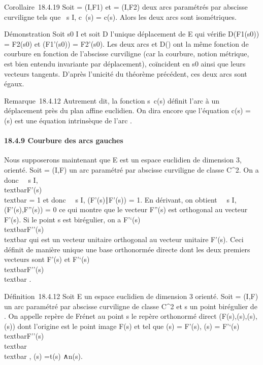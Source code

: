 Corollaire~18.4.19 Soit  = (I,F1) et 
= (I,F2) deux arcs paramétrés par abscisse curviligne tels que
\forall~s \in I, c~(s) =
c(s). Alors les deux arcs sont isométriques.

Démonstration Soit s0 \in I et soit D l'unique déplacement de E
qui vérifie D(F1(s0)) = F2(s0)
et \overrightarrowD(F1'(s0)) =
F2'(s0). Les deux arcs  et
D() ont la même fonction de courbure en fonction de
l'abscisse curviligne (car la courbure, notion métrique, est bien
entendu invariante par déplacement), coïncident en s0 ainsi
que leurs vecteurs tangents. D'après l'unicité du théorème précédent,
ces deux arcs sont égaux.

Remarque~18.4.12 Autrement dit, la fonction
s\mapsto~c\Gamma(s) définit l'arc \Gamma à un
déplacement près du plan affine euclidien. On dira encore que l'équation
c\Gamma(s) = \gamma(s) est une équation intrinsèque de l'arc \Gamma.

\paragraph{18.4.9 Courbure des arcs gauches}

Nous supposerons maintenant que E est un espace euclidien de dimension
3, orienté. Soit \Gamma = (I,F) un arc paramétré par abscisse curviligne de
classe C^2. On a donc \forall~~s \in I,
\\textbar{}F'(s)\\textbar{} = 1 et donc
\forall~~s \in I,
(F'(s)∣F'(s)) = 1. En dérivant, on obtient
\forall~~s \in I,(F'(s),F''(s)) = 0 ce qui montre que le
vecteur F''(s) est orthogonal au vecteur F'(s). Si le point s est
birégulier, on a  F'`(s) \over
\\textbar{}F''(s)\\textbar{} qui est un
vecteur unitaire orthogonal au vecteur unitaire F'(s). Ceci définit de
manière unique une base orthonormée directe dont les deux premiers
vecteurs sont F'(s) et  F'`(s) \over
\\textbar{}F''(s)\\textbar{} .

Définition~18.4.12 Soit E un espace euclidien de dimension 3 orienté.
Soit \Gamma = (I,F) un arc paramétré par abscisse curviligne de classe
C^2 et s un point birégulier de \Gamma. On appelle repère de
Frénet au point s le repère orthonormé direct
(F(s),\vect(s),\vecn(s),\vecb(s))
dont l'origine est le point image F(s) et tel que
\vect(s) = F'(s), \vecn(s) =
F'`(s) \over
\\textbar{}F''(s)\\textbar{}\\textbar{}
, \vecb(s) =\vec t(s)
∧\vec n(s).

